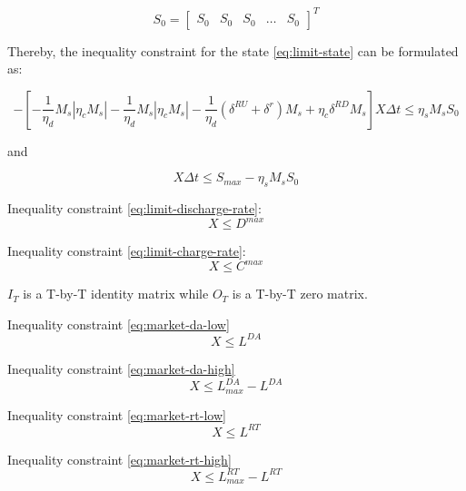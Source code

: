 \[
S_0 = 
\begin{bmatrix}
S_0 & S _0 & S_0 & \dots & S_0
\end{bmatrix} ^ {T}
\]

Thereby, the inequality constraint for the state \eqref{eq:limit-state} can be formulated as:

\begin{equation*}
- [-\frac{1}{\eta_d}M_s | \eta_c M_s | -\frac{1}{\eta_d}M_s | \eta_c M_s | -\frac{1}{\eta_d}  (\delta^{RU} + \delta^r) M_s + \eta_c \delta^{RD} M_s ] X \Delta t \leq \eta_s M_s S_0 
\end{equation*}

and 

\begin{equation*}
[-\frac{1}{\eta_d}M_s | \eta_c M_s | -\frac{1}{\eta_d}M_s | \eta_c M_s | -\frac{1}{\eta_d}  \delta^{RU} M_s + \eta_c (\delta^{RD}+\delta^r) M_s ] X \Delta t \leq S_{max} - \eta_s M_s S_0
\end{equation*}

Inequality constraint \eqref{eq:limit-discharge-rate}:
\begin{equation*}
[I_T | O_T | I_T | O_T | \delta_t^{RU}I_T]X \leq D^{max}
\end{equation*}

Inequality constraint \eqref{eq:limit-charge-rate}:
\begin{equation*}
[O_T | I_T | O_T | I_T | \delta_t^{RD}I_T]X \leq C^{max}
\end{equation*}

$I_T$ is a T-by-T identity matrix while $O_T$ is a T-by-T zero matrix. 

Inequality constraint \eqref{eq:market-da-low}
\begin{equation*}
[I_T | -I_T | O_T | O_T | O_T]X \leq L^{DA}
\end{equation*}

Inequality constraint \eqref{eq:market-da-high}
\begin{equation*}
[-I_T | I_T | O_T | O_T | O_T]X \leq L_{max}^{DA} - L^{DA}
\end{equation*}

Inequality constraint \eqref{eq:market-rt-low}
\begin{equation*}
[O_T | O_T | I_T | -I_T | O_T]X \leq L^{RT}
\end{equation*}

Inequality constraint \eqref{eq:market-rt-high}
\begin{equation*}
[O_T | O_T | -I_T | I_T | O_T]X \leq L_{max}^{RT} - L^{RT}
\end{equation*}

